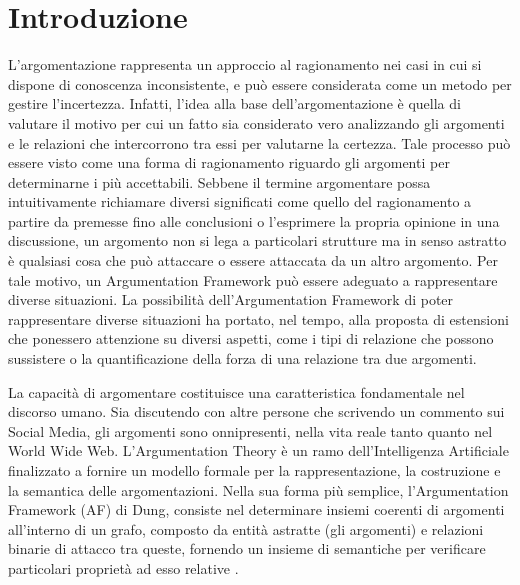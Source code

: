 
\cleardoublepage
\chapter*{Introduzione}
L'argomentazione rappresenta un approccio al ragionamento nei casi in cui si dispone di conoscenza inconsistente, e può essere considerata come un metodo per gestire l’incertezza. Infatti, l’idea alla base dell'argomentazione è quella di valutare il motivo per cui un fatto sia considerato vero analizzando gli argomenti e le relazioni che intercorrono tra essi per valutarne la certezza. Tale processo può essere visto come una forma di ragionamento riguardo gli argomenti per determinarne i più accettabili. Sebbene il termine argomentare possa intuitivamente richiamare diversi significati come quello del ragionamento a partire da premesse fino alle conclusioni o l'esprimere la propria opinione in una discussione, un argomento non si lega a particolari strutture ma in senso astratto è qualsiasi cosa che può attaccare o essere attaccata da un altro argomento. Per tale motivo, un Argumentation Framework può essere adeguato a rappresentare diverse situazioni. La possibilità dell'Argumentation Framework di poter rappresentare diverse situazioni ha portato, nel tempo, alla proposta di estensioni che ponessero attenzione su diversi aspetti, come i tipi di relazione che possono sussistere o la quantificazione della forza di una relazione tra due argomenti.

La capacità di argomentare costituisce una caratteristica fondamentale nel discorso umano. Sia discutendo con altre persone che scrivendo un commento sui Social Media, gli argomenti sono onnipresenti, nella vita reale tanto quanto nel World Wide Web. L'Argumentation Theory è un ramo dell'Intelligenza Artificiale finalizzato a fornire un modello formale per la rappresentazione, la costruzione e la semantica delle argomentazioni. Nella sua forma più semplice, l’Argumentation Framework (AF) di Dung, consiste nel determinare insiemi coerenti di argomenti all'interno di un grafo, composto da entità astratte (gli argomenti) e relazioni binarie di attacco tra queste, fornendo un insieme di semantiche per verificare particolari proprietà ad esso relative \cite{dung1995acceptability}. 


